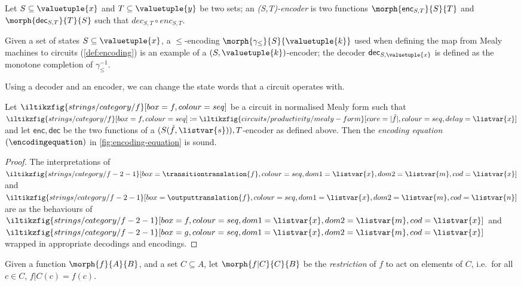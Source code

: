 \begin{definition}[Encoder]\label{def:encoder}
    Let \(S \subseteq \valuetuple{x}\) and \(T \subseteq \valuetuple{y}\) be two
    sets; an \emph{(S,T)-encoder} is two functions \(
    \morph{\mathsf{enc}_{S,T}}{S}{T}
    \) and \(
    \morph{\mathsf{dec}_{S,T}}{T}{S}
    \) such that \(dec_{S,T} \circ enc_{S,T}\).
\end{definition}

\begin{example}
    Given a set of states \(S \subseteq \valuetuple{x}\), a \(\leq\)-encoding
    \(\morph{\gamma_\leq}{S}{\valuetuple{k}}\) used when defining the map from
    Mealy machines to circuits (\cref{def:encoding}) is an example of a
    \((S,\valuetuple{k})\)-encoder; the decoder
    \(\mathsf{dec}_{S,\valuetuple{x}}\) is defined as the monotone completion
    of \(\gamma_\leq^{-1}\).
\end{example}

Using a decoder and an encoder, we can change the state words that a circuit
operates with.

\begin{proposition}\label{prop:encoding-equation}
    Let \(\iltikzfig{strings/category/f}[box=f,colour=seq]\) be a circuit in
    normalised Mealy form such that \(
    \iltikzfig{strings/category/f}[box=f,colour=seq]
    \coloneqq
    \iltikzfig{circuits/productivity/mealy-form}[core=|\hat{f}|,colour=seq,delay=\listvar{x}]
    \) and let \(\mathsf{enc},\mathsf{dec}\) be the two functions of a
    \((S(\hat{f},\listvar{s})),T\)-encoder as defined above.
    Then the \emph{encoding equation} \((\encodingequation)\) in
    \cref{fig:encoding-equation} is sound.
\end{proposition}
\begin{proof}
    The interpretations of \(
    \iltikzfig{strings/category/f-2-1}[box={\transitiontranslation{f}},colour=seq,dom1=\listvar{x},dom2=\listvar{m},cod=\listvar{x}]
    \) and \(
    \iltikzfig{strings/category/f-2-1}[box={\outputtranslation{f}},colour=seq,dom1=\listvar{x},dom2=\listvar{m},cod=\listvar{n}]
    \) are as the behaviours of \(
    \iltikzfig{strings/category/f-2-1}[box={f},colour=seq,dom1=\listvar{x},dom2=\listvar{m},cod=\listvar{x}]
    \) and \(
    \iltikzfig{strings/category/f-2-1}[box={g},colour=seq,dom1=\listvar{x},dom2=\listvar{m},cod=\listvar{x}]
    \) wrapped in appropriate decodings and encodings.
\end{proof}

\begin{notation}[Restriction]
    Given a function \(\morph{f}{A}{B}\), and a set
    \(C \subseteq A\), let \(\morph{f|C}{C}{B}\) be the \emph{restriction} of
    \(f\) to act on elements of \(C\), i.e.\ for all \(c \in C\),
    \(f|C(c) = f(c)\).
\end{notation}

